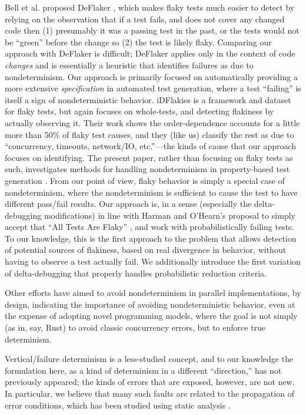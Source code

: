 Bell et al. proposed DeFlaker \cite{bell2018d}, which makes flaky tests much easier to detect by relying on the observation that if a test fails, and does not cover any changed code then (1) presumably it was a passing test in the past, or the tests would not be ``green'' before the change so (2) the test is likely flaky.  Comparing our approach with DeFlaker is difficult; DeFlaker applies only in the context of code \emph{changes} and is essentially a heuristic that identifies failures as due to nondeterminism.  Our approach is primarily focused on automatically providing a more extensive \emph{specification} in automated test generation, where a test ``failing'' is itself a sign of nondeterministic behavior.  iDFlakies \cite{idflakies} is a framework and dataset for flaky tests, but again focuses on whole-tests, and detecting flakiness by actually observing it.  Their work shows the order-dependence accounts for a little more than 50\% of flaky test causes, and they (like us) classify the rest as due to ``concurrency, timeouts,
network/IO, etc.''---the kinds of cause that our approach focuses on identifying.
The present paper, rather than focusing on flaky tests as such, investigates methods for handling nondeterminism in property-based test generation \cite{ClaessenH00}.  From our point of view, flaky behavior is simply a special case of nondeterminism, where the nondeterminism is sufficient to cause the test to have different pass/fail results.  Our approach is, in a sense (especially the delta-debugging modifications) in line with Harman and O'Hearn's proposal to simply accept that ``All Tests Are Flaky'' \cite{StartupstoScaleups}, and work with probabilistically failing tests.  To our
knowledge, this is the first approach to the problem that
allows detection of potential sources of flakiness, based on real divergence in
behavior, without having to observe a test actually fail.  We additionally introduce the first variation of
delta-debugging that properly handles probabilistic reduction criteria.

Other efforts \cite{ParallelDeterministic} have aimed to avoid nondeterminism in parallel implementations, by design, indicating the importance of avoiding nondeterministic behavior, even at the expense of adopting novel programming models, where the goal is not simply (as in, say, Rust) to avoid classic concurrency errors, but to enforce true determinism.

Vertical/failure determinism is a less-studied concept, and to our knowledge the formulation here, as a kind of determinism in a different ``direction,'' has not previously appeared; the kinds of errors that are exposed, however, are not new.  In particular, we believe that many such faults are related to the propagation of error conditions, which has been studied using static analysis \cite{FileProp}.

